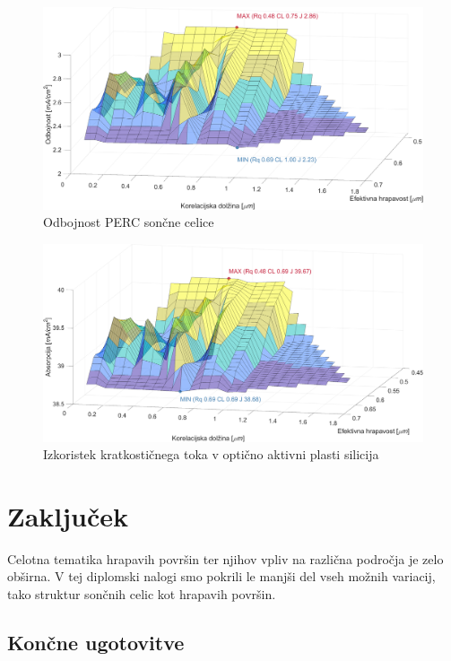 \documentclass[a4paper,twoside,openright,12pt,slovene]{book}
\begin{document}
\begin{figure}[H]
    \centering
    \includegraphics[width=150mm]{Slike/odb_PERC.png}
    \caption{Odbojnost PERC sončne celice}
    \label{fig:odb_PERC}
\end{figure}

\begin{figure}[H]
    \centering
    \includegraphics[width=150mm]{Slike/cSi_PERC.png}
    \caption{Izkoristek kratkostičnega toka v optično aktivni plasti silicija}
    \label{fig:cSi}
\end{figure}


\chapter{Zaključek}

Celotna tematika hrapavih površin ter njihov vpliv na različna področja je zelo obširna. V tej diplomski nalogi smo pokrili le manjši del vseh možnih variacij, tako struktur sončnih celic kot hrapavih površin.

\section{Končne ugotovitve}
\end{document}
